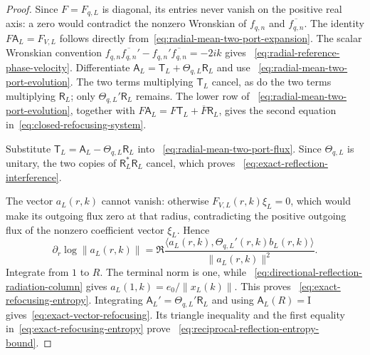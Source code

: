 \documentclass[11pt]{article}
\newcommand{\Id}{\mathrm I}
\theoremstyle{definition}
\theoremstyle{remark}
\begin{document}
\begin{proof}
Since $F=F_{q,L}$ is diagonal, its entries never vanish on the positive real
axis: a zero would contradict the nonzero Wronskian of $f_{q,n}$ and
$\overline{f_{q,n}}$.  The identity $F\mathsf A_L=F_{V,L}$ follows directly
from~\eqref{eq:radial-mean-two-port-expansion}.  The scalar Wronskian convention
$f_{q,n}\overline{f_{q,n}}'-f_{q,n}'\overline{f_{q,n}}=-2ik$ gives
~\eqref{eq:radial-reference-phase-velocity}.  Differentiate
$\mathsf A_L=\mathsf T_L+\Theta_{q,L}\mathsf R_L$ and use
~\eqref{eq:radial-mean-two-port-evolution}.  The two terms multiplying
$\mathsf T_L$ cancel, as do the two terms multiplying $\mathsf R_L$; only
$\Theta_{q,L}'\mathsf R_L$ remains.  The lower row of
~\eqref{eq:radial-mean-two-port-evolution}, together with
$F\mathsf A_L=F\mathsf T_L+\overline F\mathsf R_L$, gives the second equation
in~\eqref{eq:closed-refocusing-system}.

Substitute $\mathsf T_L=\mathsf A_L-\Theta_{q,L}\mathsf R_L$ into
~\eqref{eq:radial-mean-two-port-flux}.  Since $\Theta_{q,L}$ is unitary, the
two copies of $\mathsf R_L^*\mathsf R_L$ cancel, which proves
~\eqref{eq:exact-reflection-interference}.

The vector $a_L(r,k)$ cannot vanish: otherwise $F_{V,L}(r,k)\xi_L=0$, which
would make its outgoing flux zero at that radius, contradicting the positive
outgoing flux of the nonzero coefficient vector $\xi_L$.  Hence
\begin{equation}
 \partial_r\log\|a_L(r,k)\|
 =\Re\frac{\langle a_L(r,k),
             \Theta_{q,L}'(r,k)b_L(r,k)\rangle}{\|a_L(r,k)\|^2}.
\end{equation}
Integrate from $1$ to $R$.  The terminal norm is one, while
~\eqref{eq:directional-reflection-radiation-column} gives
$a_L(1,k)=e_0/\|x_L(k)\|$.  This proves
~\eqref{eq:exact-refocusing-entropy}.  Integrating
$\mathsf A_L'=\Theta_{q,L}'\mathsf R_L$ and using
$\mathsf A_L(R)=\Id$ gives~\eqref{eq:exact-vector-refocusing}.  Its triangle
inequality and the first equality in~\eqref{eq:exact-refocusing-entropy} prove
~\eqref{eq:reciprocal-reflection-entropy-bound}.
\end{proof}
\end{document}
